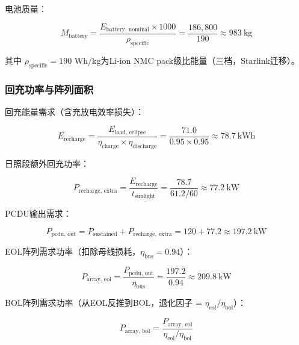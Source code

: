 电池质量：

\begin{equation}
  M_{\text{battery}} = \frac{E_{\text{battery, nominal}} \times 1000}{\rho_{\text{specific}}}
                      = \frac{186,800}{190} \approx 983\ \text{kg}
  \label{eq:battery-mass}
\end{equation}

其中 $\rho_{\text{specific}} = 190$ Wh/kg为Li-ion NMC pack级比能量（三档，Starlink迁移）。

\subsubsection{回充功率与阵列面积}

回充能量需求（含充放电效率损失）：

\begin{equation}
  E_{\text{recharge}} = \frac{E_{\text{load, eclipse}}}{\eta_{\text{charge}} \times \eta_{\text{discharge}}}
                       = \frac{71.0}{0.95 \times 0.95} \approx 78.7\ \text{kWh}
  \label{eq:recharge-energy}
\end{equation}

日照段额外回充功率：

\begin{equation}
  P_{\text{recharge, extra}} = \frac{E_{\text{recharge}}}{t_{\text{sunlight}}}
                               = \frac{78.7}{61.2/60} \approx 77.2\ \text{kW}
  \label{eq:recharge-power}
\end{equation}

PCDU输出需求：

\begin{equation}
  P_{\text{pcdu, out}} = P_{\text{sustained}} + P_{\text{recharge, extra}}
                         = 120 + 77.2 \approx 197.2\ \text{kW}
  \label{eq:pcdu-out}
\end{equation}

EOL阵列需求功率（扣除母线损耗，$\eta_{\text{bus}} = 0.94$）：

\begin{equation}
  P_{\text{array, eol}} = \frac{P_{\text{pcdu, out}}}{\eta_{\text{bus}}}
                          = \frac{197.2}{0.94} \approx 209.8\ \text{kW}
  \label{eq:array-eol-power}
\end{equation}

BOL阵列需求功率（从EOL反推到BOL，退化因子 = $\eta_{\text{eol}}/\eta_{\text{bol}}$）：

\begin{equation}
  P_{\text{array, bol}} = \frac{P_{\text{array, eol}}}{\eta_{\text{eol}}/\eta_{\text{bol}}}
  \label{eq:array-bol-power}
\end{equation}

